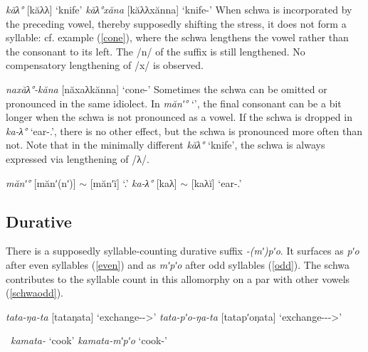 \documentclass[a4paper, 12pt]{article}
\newcommand{\citeay}[2][]{
   \citeauthor{#2} (\citeyear[#1]{#2})}
\begin{document}
	\pex\label{knife}\a \emph{kăλ°} [kăλλ] \hfill `knife'
		\a\label{nn}\emph{kăλ°xăna} [kăλλxănna] \hfill `knife-{\Ins}'
	\xe
	When schwa is incorporated by the preceding vowel, thereby supposedly shifting the stress, it does not form a syllable: cf. example (\ref{cone}), where the schwa lengthens the vowel rather than the consonant to its left. The /n/ of the suffix is still lengthened. No compensatory lengthening of /x/ is observed.

	\ex\label{cone}\emph{naxăλ°-kăna} [năxaλkănna] \hfill `cone-{\Ins}’ \xe
	Sometimes the schwa can be omitted or pronounced in the same idiolect. In \emph{mănʹ°} `{\Fsg}', the final consonant can be a bit longer when the schwa is not pronounced as a vowel. If the schwa is dropped in \emph{ka-λ°} `ear-{\Poss}.{\Ssg}', there is no other effect, but the schwa is pronounced more often than not. Note that in the minimally different \emph{kăλ°} `knife', the schwa is always expressed via lengthening of /λ/.

	\pex\label{}\a \emph{mănʹ°} [mănʹ(nʹ)] $\sim$ [mănʹĭ] \hfill `{\Fsg}.{\Nom}'
		\a \emph{ka-λ°} [kaλ] $\sim$ [kaλĭ] \hfill `ear-{\Poss}.{\Ssg}'
	\xe
%	

			\subsection{Durative}
			
	There is a supposedly syllable-counting durative suffix \emph{-(mʹ)pʹo}. It surfaces as \emph{pʹo} after even syllables (\ref{even}) and as \emph{mʹpʹo} after odd syllables (\ref{odd}). The schwa contributes to the syllable count in this allomorphy on a par with other vowels (\ref{schwaodd}).
	
	\pex\label{even}\a \emph{tata-ŋa-ta} [tataŋata] \hfill `exchange-{\Gfs}-{\Tsg}>{\Pl}'		
		\a \emph{tata-pʹo-ŋa-ta} [tatapʹoŋata] \hfill `exchange-{\Gfs}-{\Dur}-{\Tsg}>{\Pl}'
	\xe	
	
	\pex~\label{odd}\a \emph{kamata-} \hfill `cook'		
		\a \emph{kamata-mʹpʹo} \hfill `cook-{\Dur}' \\		
	\xe	
\end{document}
